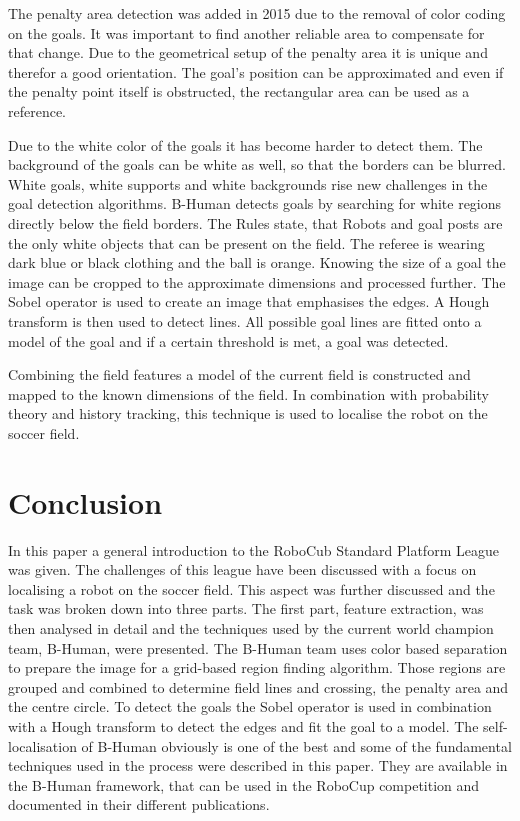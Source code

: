 \documentclass[12pt, a4paper, doc]{apa6}
\begin{document}
  The penalty area detection was added in 2015 due to the removal of color coding on the goals. It was important to find another reliable area to compensate for that change. Due to the geometrical setup of the penalty area it is unique and therefor a good orientation. The goal's position can be approximated and even if the penalty point itself is obstructed, the rectangular area can be used as a reference.

  Due to the white color of the goals it has become harder to detect them. The background of the goals can be white as well, so that the borders can be blurred. White goals, white supports and white backgrounds rise new challenges in the goal detection algorithms. B-Human detects goals by searching for white regions directly below the field borders. The Rules state, that Robots and goal posts are the only white objects that can be present on the field. The referee is wearing dark blue or black clothing and the ball is orange. Knowing the size of a goal the image can be cropped to the approximate dimensions and processed further. The Sobel operator is used to create an image that emphasises the edges. A Hough transform is then used to detect lines. All possible goal lines are fitted onto a model of the goal and if a certain threshold is met, a goal was detected.

  Combining the field features a model of the current field is constructed and mapped to the known dimensions of the field. In combination with probability theory and history tracking, this technique is used to localise the robot on the soccer field.

  \section{Conclusion}
  In this paper a general introduction to the RoboCub Standard Platform League was given. The challenges of this league have been discussed with a focus on localising a robot on the soccer field. This aspect was further discussed and the task was broken down into three parts. The first part, feature extraction, was then analysed in detail and the techniques used by the current world champion team, B-Human, were presented. The B-Human team uses color based separation to prepare the image for a grid-based region finding algorithm. Those regions are grouped and combined to determine field lines and crossing, the penalty area and the centre circle. To detect the goals the Sobel operator is used in combination with a Hough transform to detect the edges and fit the goal to a model.
  The self-localisation of B-Human obviously is one of the best and some of the fundamental techniques used in the process were described in this paper. They are available in the B-Human framework, that can be used in the RoboCup competition and documented in their different publications.

  \newpage

  \printbibliography
\end{document}
